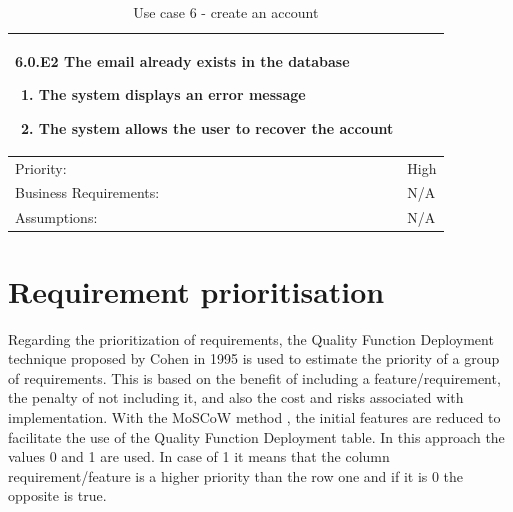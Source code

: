 \documentclass{scrreprt}
\begin{document}
\begin{table}[H]
\begin{adjustbox}{width=1.2\textwidth,center=\textwidth}
\begin{tabular}{|m{4cm}|m{12cm}|}
\begin{enumerate}
            \end{enumerate}
            \textbf{6.0.E2 The email already exists in the database}
            \begin{enumerate}
                \item The system displays an error message
                \item The system allows the user to recover the account
            \end{enumerate} \\
            \hline
            Priority: & High \\
            \hline
            Business Requirements: & N/A \\
            \hline
            Assumptions: & N/A \\
            \hline
        \end{tabular}
    \end{adjustbox}
    \caption{Use case 6 - create an account}
    \label{use case 6}
\end{table}

\chapter{Requirement prioritisation}

Regarding the prioritization of requirements, the Quality Function Deployment technique
proposed by Cohen in 1995 \cite{cohen1995quality} is used to estimate the priority of a group of requirements.
This is based on the benefit of including a feature/requirement, the penalty of not including
it, and also the cost and risks associated with implementation. With the MoSCoW method \cite{clegg1994case}, the
initial features are reduced to facilitate the use of the Quality Function Deployment table.
\newline
In this approach the values 0 and 1 are used. In case of 1 it means that the column requirement/feature
is a higher priority than the row one and if it is 0 the opposite is true.
\end{document}

